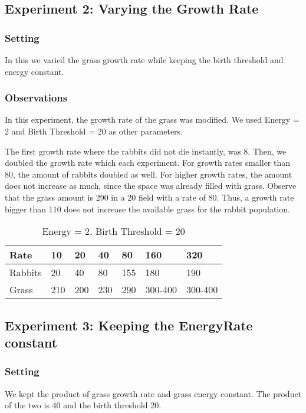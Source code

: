 \documentclass[11pt]{article}
\begin{document}
\subsection{Experiment 2: Varying the Growth Rate}

\subsubsection{Setting}
In this we varied the grass growth rate while keeping the birth threshold and energy constant.

\subsubsection{Observations}
In this experiment, the growth rate of the grass was modified.
We used Energy = 2 and Birth Threshold = 20 as other parameters.

The first growth rate where the rabbits did not die instantly, was 8.
Then, we doubled the growth rate which each experiment.
For growth rates smaller than 80, the amount of rabbits doubled as well.
For higher growth rates, the amount does not increase as much, since the space was already filled with grass.
Observe that the grass amount is 290 in a 20 field with a rate of 80.
Thus, a growth rate bigger than 110 does not increase the available grass for the rabbit population.

\begin{table}[]
	\centering
	\caption{Energy = 2, Birth Threshold = 20}
	\label{my-label}
	\begin{tabular}{@{}lllllll@{}}
		\toprule
		Rate    & 10  & 20  & 40  & 80  & 160     & 320     \\ \midrule
		Rabbits & 20  & 40  & 80  & 155 & 180     & 190     \\
		Grass   & 210 & 200 & 230 & 290 & 300-400 & 300-400 \\ \bottomrule
	\end{tabular}
\end{table}

\subsection{Experiment 3: Keeping the Energy\texttimes Rate constant}

\subsubsection{Setting}
We kept the product of grass growth rate and grass energy constant.
The product of the two is 40 and the birth threshold 20.
\end{document}
